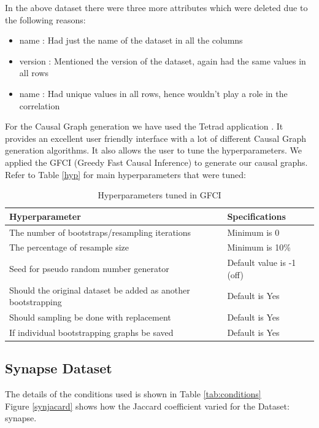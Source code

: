\documentclass[sigconf,review,anonymous,nonacm=true]{acmart}
\begin{document}
In the above dataset there were three more attributes which were deleted due to the following reasons:
\begin{itemize}
    \item name : Had just the name of the dataset in all the columns
    \item version : Mentioned the version of the dataset, again had the same values in all rows
    \item name : Had unique values in all rows, hence wouldn't play a role in the correlation
\end{itemize}
For the Causal Graph generation we have used the Tetrad application \cite{TT}. It provides an excellent user friendly interface with a lot of different Causal Graph generation algorithms. It also allows the user to tune the hyperparameters.
We applied the GFCI (Greedy Fast Causal Inference)\cite{GFCI} to generate our causal graphs. Refer to Table \ref{hyp} for main hyperparameters that were tuned:

\begin{table}[h]
\centering
\caption{Hyperparameters tuned in GFCI}
\label{hyp}
\label{your-table-label}
\begin{tabular}{|p{5cm}|p{3cm}|}
\hline
Hyperparameter & Specifications \\ \hline
The number of bootstraps/resampling iterations & Minimum is 0 \\ \hline
The percentage of resample size & Minimum is 10\% \\ \hline
Seed for pseudo random number generator & Default value is -1 (off)\\ \hline
Should the original dataset be added as another bootstrapping & Default is Yes\\ \hline
Should sampling be done with replacement & Default is Yes \\ \hline
If individual bootstrapping graphs be saved & Default is Yes \\ \hline
\end{tabular}
\end{table}

\subsection{Synapse Dataset}
The details of the conditions used is shown in Table \ref{tab:conditions}\\
Figure \ref{synjacard} shows how the Jaccard coefficient varied for the Dataset: synapse. 
\end{document}

